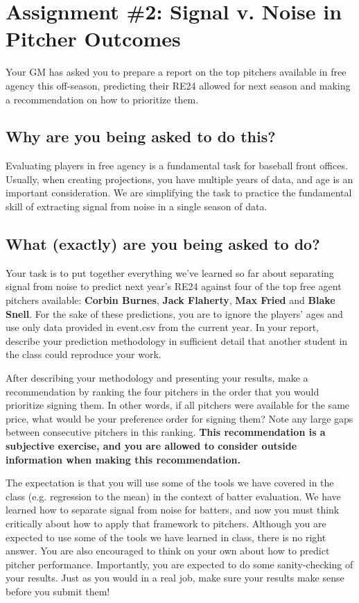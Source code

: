 \documentclass{article}
\begin{document}
  \section*{\sc Assignment \#2: Signal v. Noise in Pitcher Outcomes}

    Your GM has asked you to prepare a report on the top pitchers available in free agency this off-season, predicting their RE24 allowed for next season and making a recommendation on how to prioritize them.

    \subsection*{\sc Why are you being asked to do this?}

      Evaluating players in free agency is a fundamental task for baseball front offices. Usually, when creating projections, you have multiple years of data, and age is an important consideration. We are simplifying the task to practice the fundamental skill of extracting signal from noise in a single season of data.

    \subsection*{\sc What (exactly) are you being asked to do?}

      Your task is to put together everything we've learned so far about separating signal from noise to predict next year's RE24 against four of the top free agent pitchers available: {\bf Corbin Burnes}, {\bf Jack Flaherty}, {\bf Max Fried} and {\bf Blake Snell}. For the sake of these predictions, you are to ignore the players' ages and use only data provided in event.csv from the current year. In your report, describe your prediction methodology in sufficient detail that another student in the class could reproduce your work.
      
      After describing your methodology and presenting your results, make a recommendation by ranking the four pitchers in the order that you would prioritize signing them. In other words, if all pitchers were available for the same price, what would be your preference order for signing them? Note any large gaps between consecutive pitchers in this ranking. {\bf This recommendation is a subjective exercise, and you are allowed to consider outside information when making this recommendation.}

      The expectation is that you will use some of the tools we have covered in the class (e.g. regression to the mean) in the context of batter evaluation. We have learned how to separate signal from noise for batters, and now you must think critically about how to apply that framework to pitchers. Although you are expected to use some of the tools we have learned in class, there is no right answer. You are also encouraged to think on your own about how to predict pitcher performance. Importantly, you are expected to do some sanity-checking of your results. Just as you would in a real job, make sure your results make sense before you submit them!
\end{document}
